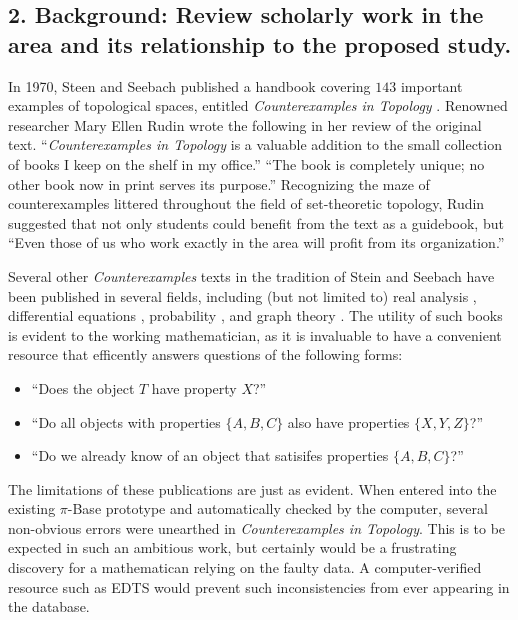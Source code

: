 \documentclass[10pt]{article}
\begin{document}
\subsection*{2. Background:  Review scholarly work in the area and its relationship to the proposed study.}

In 1970, Steen and Seebach published a handbook
covering \(143\) important examples of topological spaces, entitled
\textit{Counterexamples in Topology} \cite{MR1382863}. Renowned researcher
Mary Ellen Rudin wrote the following in her review \cite{MR1536430}
of the original text.
``\textit{Counterexamples in Topology} is a valuable addition to the small
collection of books I keep on the shelf in my office.'' ``The book is
completely unique; no other book now in print serves its purpose.''
Recognizing the maze of counterexamples littered throughout the
field of set-theoretic topology, Rudin suggested that not only students could
benefit from the text as a guidebook, but
``Even those of us who work exactly in the area will profit from
its organization.''

Several other \textit{Counterexamples} texts
in the tradition of Stein and Seebach have been published in several fields,
including (but not limited to) real analysis \cite{MR1256489}, differential
equations \cite{MR1113487}, probability \cite{MR930671}, and
graph theory \cite{MR0491272}.
The utility of such books is evident to the working mathematician, as it is
invaluable to have a convenient resource that efficently
answers questions of the following forms:
\begin{itemize}
  \item ``Does the object \(T\) have property \(X\)?''
  \item ``Do all objects with properties \(\{A,B,C\}\) also have properties
          \(\{X,Y,Z\}\)?''
  \item ``Do we already know of an object that satisifes properties
          \(\{A,B,C\}\)?''
\end{itemize}

The limitations of these publications are just as evident. When entered into
the existing \(\pi\)-Base prototype and automatically checked by the computer,
several non-obvious errors were unearthed in
\textit{Counterexamples in Topology}. This is to be
expected in such an ambitious work, but certainly would be a frustrating
discovery for a mathematican relying on the faulty data. A computer-verified
resource such as EDTS would prevent such inconsistencies from ever appearing
in the database.
\end{document}
